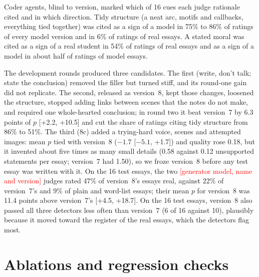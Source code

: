 \documentclass[11pt]{article}
\newcommand{\TBD}[1]{\textcolor{red}{[#1]}}
\newcommand{\genmodel}{\TBD{generator model, name and version}}
\begin{document}
Coder agents, blind to version, marked which of 16 cues each judge rationale cited and in which direction. Tidy structure (a neat arc, motifs and callbacks, everything tied together) was cited as a sign of a model in 75\% to 86\% of ratings of every model version and in 6\% of ratings of real essays. A stated moral was cited as a sign of a real student in 54\% of ratings of real essays and as a sign of a model in about half of ratings of model essays.

The development rounds produced three candidates. The first (write, don't talk; state the conclusion) removed the filler but turned stiff, and its round-one gain did not replicate. The second, released as version~8, kept those changes, loosened the structure, stopped adding links between scenes that the notes do not make, and required one whole-hearted conclusion; in round two it beat version~7 by 6.3 points of $p$ [+2.2, +10.5] and cut the share of ratings citing tidy structure from 86\% to 51\%. The third (8c) added a trying-hard voice, scenes and attempted images: mean $p$ tied with version~8 ($-1.7$ [$-5.1$, +1.7]) and quality rose 0.18, but it invented about five times as many small details (0.58 against 0.12 unsupported statements per essay; version~7 had 1.50), so we froze version~8 before any test essay was written with it. On the 16 test essays, the two \genmodel{} judges rated 47\% of version~8's essays real, against 22\% of version~7's and 9\% of plain and word-list essays; their mean $p$ for version~8 was 11.4 points above version~7's [+4.5, +18.7]. On the 16 test essays, version~8 also passed all three detectors less often than version~7 (6 of 16 against 10), plausibly because it moved toward the register of the real essays, which the detectors flag most.

\FloatBarrier
\section{Ablations and regression checks}
\label{sec:appendix-ablation}
\end{document}
